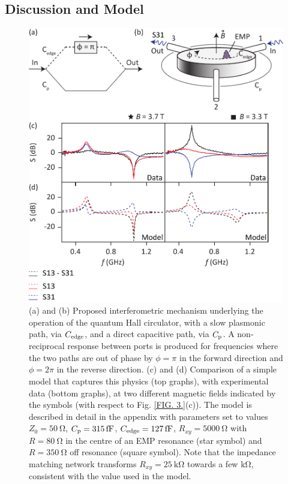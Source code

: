 \subsection{Discussion and Model}
\begin{figure}
\includegraphics[width=0.7\columnwidth]{fig4_QH}
\caption[Comparison of data and model]{\label{FIG. 4.}
(a) and (b) Proposed interferometric mechanism underlying the operation of the quantum Hall circulator, with a slow plasmonic path, via $C_{\rm edge}$, and a direct capacitive path, via $C_{\rm p}$. A non-reciprocal response between ports is produced for frequencies where the two paths are out of phase by $\phi = \pi$ in the forward direction and $\phi = 2\pi$ in the reverse direction. 
(c) and (d) Comparison of a simple model that captures this physics (top graphs), with experimental data (bottom graphs), at two different magnetic fields indicated by the symbols (with respect to Fig. \ref{FIG. 3.}(c)). The model is described in detail in the appendix with parameters set to values $Z_0 = \SI{50}{\ohm}$, $C_{\rm p} = \SI{315}{\femto\farad}$, $C_{\rm edge} = \SI{127}{\femto\farad}$, $R_{xy} = \SI{5000}{\ohm}$ with $R = \SI{80}{\ohm}$ in the centre of an EMP resonance (star symbol) and $R = \SI{350}{\ohm}$ off resonance (square symbol). Note that the impedance matching network transforms $R_{xy} = \SI{25}{\kilo\ohm}$ towards a few \si{\kilo\ohm}, consistent with the value used in the model.}
\end{figure}

